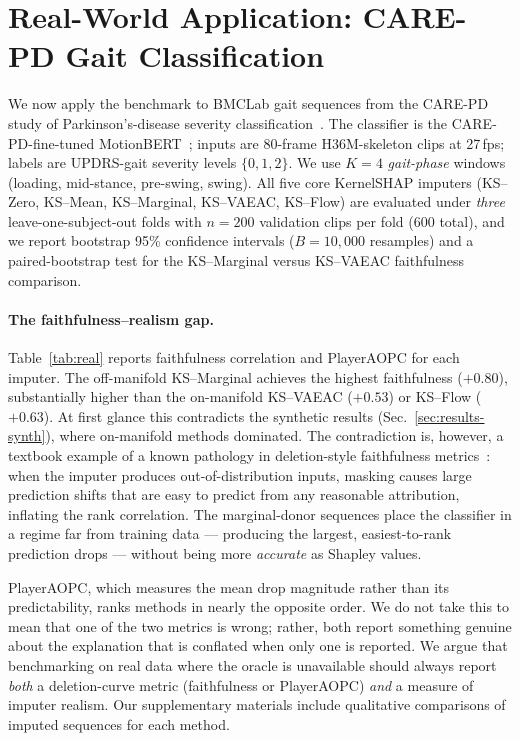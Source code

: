 \section{Real-World Application: CARE-PD Gait Classification}
\label{sec:results-real}

We now apply the benchmark to BMCLab gait sequences from the CARE-PD study
of Parkinson's-disease severity classification~\citep{adeli2025multi}.  The
classifier is the CARE-PD-fine-tuned MotionBERT~\citep{zhu2023motionbert};
inputs are 80-frame H36M-skeleton clips at 27\,fps; labels are UPDRS-gait
severity levels $\{0, 1, 2\}$.  We use $K{=}4$ \emph{gait-phase} windows
(loading, mid-stance, pre-swing, swing).  All five core KernelSHAP imputers
(KS--Zero, KS--Mean, KS--Marginal, KS--VAEAC, KS--Flow) are evaluated under
\emph{three} leave-one-subject-out folds with $n{=}200$ validation clips
per fold (600 total), and we report bootstrap 95\% confidence intervals
($B{=}10{,}000$ resamples) and a paired-bootstrap test for the
KS--Marginal versus KS--VAEAC faithfulness comparison.

\paragraph{The faithfulness--realism gap.}
Table~\ref{tab:real} reports faithfulness correlation and PlayerAOPC
for each imputer.  The off-manifold KS--Marginal achieves the highest
faithfulness ($+0.80$), substantially higher than the on-manifold
KS--VAEAC ($+0.53$) or KS--Flow ($+0.63$).
At first glance this contradicts the synthetic results
(Sec.~\ref{sec:results-synth}), where on-manifold methods dominated.
The contradiction is, however, a textbook example of a known pathology
in deletion-style faithfulness
metrics~\citep{hooker2019roar, jain2019attention}: when the imputer
produces out-of-distribution inputs, masking causes large prediction
shifts that are easy to predict from any reasonable attribution, inflating
the rank correlation.  The marginal-donor sequences place the classifier
in a regime far from training data --- producing the largest, easiest-to-rank
prediction drops --- without being more \emph{accurate} as Shapley values.



PlayerAOPC, which measures the mean drop magnitude rather than its
predictability, ranks methods in nearly the opposite order.  We do not
take this to mean that one of the two metrics is wrong; rather, both
report something genuine about the explanation that is conflated when only
one is reported.  We argue that benchmarking on real data where the
oracle is unavailable should always report \emph{both} a deletion-curve
metric (faithfulness or PlayerAOPC) \emph{and} a measure of imputer realism.
Our supplementary materials include qualitative comparisons of imputed
sequences for each method.

